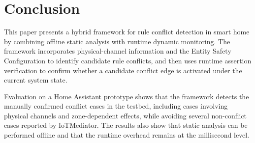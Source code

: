 \section{Conclusion}

This paper presents a hybrid framework for rule conflict detection in smart home by combining offline static analysis with runtime dynamic monitoring. The framework incorporates physical-channel information and the Entity Safety Configuration to identify candidate rule conflicts, and then uses runtime assertion verification to confirm whether a candidate conflict edge is activated under the current system state.

Evaluation on a Home Assistant prototype shows that the framework detects the manually confirmed conflict cases in the testbed, including cases involving physical channels and zone-dependent effects, while avoiding several non-conflict cases reported by IoTMediator. The results also show that static analysis can be performed offline and that the runtime overhead remains at the millisecond level.